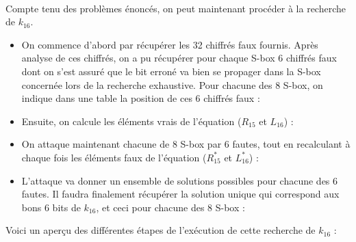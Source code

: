 			\paragraph{} Compte tenu des problèmes énoncés, on peut maintenant procéder à la recherche de $k_{16}$.
			\begin{itemize}
				\item On commence d'abord par récupérer les 32 chiffrés faux fournis. Après analyse de ces chiffrés, on a pu récupérer pour chaque S-box 6 chiffrés faux dont on s'est assuré que le bit erroné va bien se propager dans la S-box concernée lors de la recherche exhaustive. Pour chacune des 8 S-box, on indique dans une table la position de ces 6 chiffrés faux :
				
			
				\item Ensuite, on calcule les éléments vrais de l'équation ($R_{15}$ et $L_{16}$) :
				
			
				\item On attaque maintenant chacune de 8 S-box par 6 fautes, tout en recalculant à chaque fois les éléments faux de l'équation ($R_{15}^{*}$ et $L_{16}^{*}$) :
				
				
				\item L'attaque va donner un ensemble de solutions possibles pour chacune des 6 fautes. Il faudra finalement récupérer la solution unique qui correspond aux bons 6 bits de $k_{16}$, et ceci pour chacune des 8 S-box :
				
			\end{itemize}
			
			Voici un aperçu des différentes étapes de l'exécution de cette recherche de $k_{16}$ :
			
